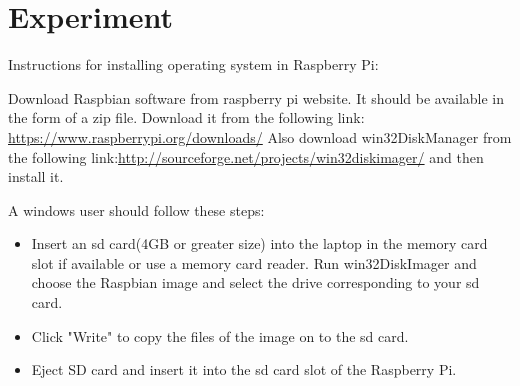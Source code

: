 \documentclass[11pt,a4paper]{report}
\begin{document}
	\newpage
	\flushleft
	\section{Experiment}
	Instructions for installing operating system in Raspberry Pi:
	
	Download Raspbian software from raspberry pi website. It should be available in the form of a zip file. Download it from the following link: \url{https://www.raspberrypi.org/downloads/} Also download win32DiskManager from the following link:\url{http://sourceforge.net/projects/win32diskimager/} and then install it.
	
	\vspace{0.5cm}
	A windows user should follow these steps:
	\begin{itemize}
		\item Insert an sd card(4GB or greater size) into the laptop in the memory card slot if available or use a memory card reader. Run win32DiskImager and choose the Raspbian image and select the drive corresponding to your sd card.
		\item Click "Write" to copy the files of the image on to the sd card.
		\item Eject SD card and insert it into the sd card slot of the Raspberry Pi.
	\end{itemize}
	
\end{document}

